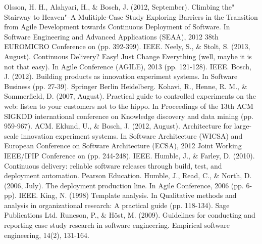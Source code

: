 \documentclass[lnbip]{svmultln}
\begin{document}

%
%
\begin{thebibliography}{5}

 Olsson, H. H., Alahyari, H., \& Bosch, J. (2012, September). Climbing the" Stairway to Heaven"--A Mulitiple-Case Study Exploring Barriers in the Transition from Agile Development towards Continuous Deployment of Software. In Software Engineering and Advanced Applications (SEAA), 2012 38th EUROMICRO Conference on (pp. 392-399). IEEE.
 Neely, S., \& Stolt, S. (2013, August). Continuous Delivery? Easy! Just Change Everything (well, maybe it is not that easy). In Agile Conference (AGILE), 2013 (pp. 121-128). IEEE. 
 Bosch, J. (2012). Building products as innovation experiment systems. In Software Business (pp. 27-39). Springer Berlin Heidelberg.
 Kohavi, R., Henne, R. M., \& Sommerfield, D. (2007, August). Practical guide to controlled experiments on the web: listen to your customers not to the hippo. In Proceedings of the 13th ACM SIGKDD international conference on Knowledge discovery and data mining (pp. 959-967). ACM.
 Eklund, U., \& Bosch, J. (2012, August). Architecture for large-scale innovation experiment systems. In Software Architecture (WICSA) and European Conference on Software Architecture (ECSA), 2012 Joint Working IEEE/IFIP Conference on (pp. 244-248). IEEE.
 Humble, J., \& Farley, D. (2010). Continuous delivery: reliable software releases through build, test, and deployment automation. Pearson Education.
 Humble, J., Read, C., \& North, D. (2006, July). The deployment production line. In Agile Conference, 2006 (pp. 6-pp). IEEE.
 King, N. (1998) Template analysis. In Qualitative methods and analysis in organizational research: A practical guide (pp. 118-134). Sage Publications Ltd.
 Runeson, P., \& Höst, M. (2009). Guidelines for conducting and reporting case study research in software engineering. Empirical software engineering, 14(2), 131-164.

\end{thebibliography}
\end{document}
